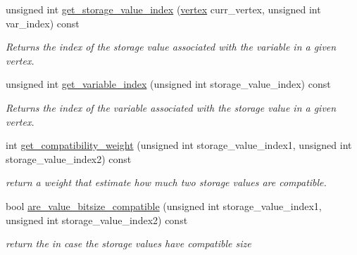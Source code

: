 \begin{DoxyCompactItemize}
unsigned int \hyperlink{classStorageValueInformation_a03f6c3fab2ebcf00fd56fda4b32194a2}{get\+\_\+storage\+\_\+value\+\_\+index} (\hyperlink{graph_8hpp_abefdcf0544e601805af44eca032cca14}{vertex} curr\+\_\+vertex, unsigned int var\+\_\+index) const
\begin{DoxyCompactList}\small\item\em Returns the index of the storage value associated with the variable in a given vertex. \end{DoxyCompactList}\item 
unsigned int \hyperlink{classStorageValueInformation_aba9fe8ab9e8d87fc8b58d470b7c8f6f5}{get\+\_\+variable\+\_\+index} (unsigned int storage\+\_\+value\+\_\+index) const
\begin{DoxyCompactList}\small\item\em Returns the index of the variable associated with the storage value in a given vertex. \end{DoxyCompactList}\item 
int \hyperlink{classStorageValueInformation_a7ed7b636cee9a94fcfeecab58c73f2bc}{get\+\_\+compatibility\+\_\+weight} (unsigned int storage\+\_\+value\+\_\+index1, unsigned int storage\+\_\+value\+\_\+index2) const
\begin{DoxyCompactList}\small\item\em return a weight that estimate how much two storage values are compatible. \end{DoxyCompactList}\item 
bool \hyperlink{classStorageValueInformation_a72bff182397c1bb40391d4709a30d1ce}{are\+\_\+value\+\_\+bitsize\+\_\+compatible} (unsigned int storage\+\_\+value\+\_\+index1, unsigned int storage\+\_\+value\+\_\+index2) const
\begin{DoxyCompactList}\small\item\em return the in case the storage values have compatible size \end{DoxyCompactList}\end{DoxyCompactItemize}
